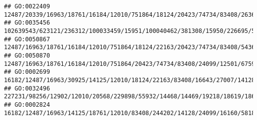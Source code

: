 \documentclass[
]{article}
\begin{document}
\begin{verbatim}
## GO:0022409                                                                                                                                        12487/20339/16963/18761/16184/12010/751864/18124/20423/74734/83408/26367/24099/20443/12501/67596/16160/20304/78473/12775/20533/21943/15117/72049/320484/15001/14998/15000/14999/15002/14961/14960/14969/381091/547431/11629/16149/12507/12511/60533/58205/20371/16186
## GO:0035456                                                                                                                                                                                                                                                       102639543/623121/236312/100033459/15951/100040462/381308/15950/226695/55932/14468/14469/23961/23960/246730/68713/69550/15953/327959/240327/15959/15957
## GO:0050867                                                                                                               12487/16963/18761/16184/12010/751864/18124/22163/20423/74734/83408/54368/27007/16170/24099/17394/12501/81897/67596/16160/20304/12775/20533/14165/21943/321019/72049/320484/15001/14998/15000/14999/15002/14961/14960/14969/381091/547431/11629/16149/12507/12511/60533/58205/20371/16186/12229
## GO:0050870                                                                                                                                                                            12487/16963/18761/16184/12010/751864/20423/74734/83408/24099/12501/67596/16160/20304/12775/20533/21943/72049/320484/15001/14998/15000/14999/15002/14961/14960/14969/381091/547431/11629/16149/12507/12511/60533/58205/20371/16186
## GO:0002699                                                                                                                                               16182/12487/16963/30925/14125/12010/18124/22163/83408/16643/27007/14128/234311/81897/16160/327957/12775/80861/58185/14972/15000/14999/21355/15006/15013/15015/110557/15018/68395/110558/15039/100529082/15024/667977/14990/69816/16149/14126/20371/20400/12229
## GO:0032496                                                                           227231/98256/12902/12010/20568/229898/55932/14468/14469/19218/18619/18671/20309/20617/414084/27007/76681/434219/20128/209387/66298/634825/382059/100041759/13237/13239/626682/626708/100041952/503491/15930/17394/81897/16160/327957/18126/66107/12775/22169/17079/14165/100503545/12263/12475/12511/60533/58205/20371/12705/12229
## GO:0002824                                                                                                                                                                                                                  16182/12487/16963/14125/18761/12010/83408/244202/14128/24099/16160/58185/72049/14972/14998/21355/15006/15013/15015/110557/15018/68395/110558/15039/100529082/15024/667977/14990/20371/12229

\end{verbatim}
\end{document}
